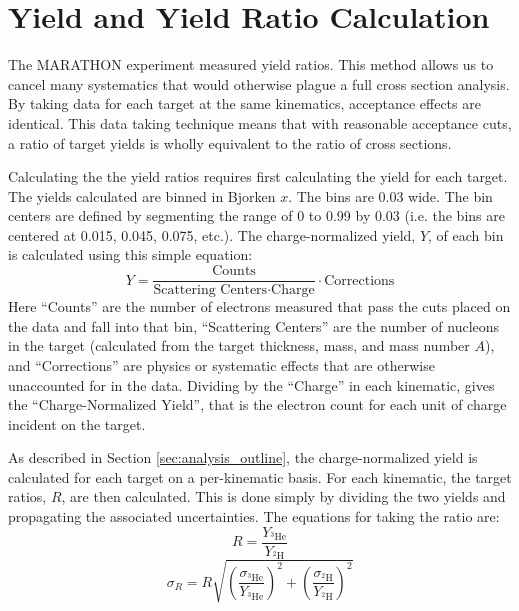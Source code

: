 \section{Yield and Yield Ratio Calculation}

The MARATHON experiment measured yield ratios. This method allows us to cancel many systematics that would otherwise plague a full cross section analysis. By taking data for each target at the same kinematics, acceptance effects are identical. This data taking technique means that with reasonable acceptance cuts, a ratio of target yields is wholly equivalent to the ratio of cross sections.

Calculating the the yield ratios requires first calculating the yield for each target. The yields calculated are binned in Bjorken $x$. The bins are 0.03 wide. The bin centers are defined by segmenting the range of 0 to 0.99 by 0.03 (i.e. the bins are centered at 0.015, 0.045, 0.075, etc.). The charge-normalized yield, $Y$, of each bin is calculated using this simple equation:
\begin{equation}
	Y = \frac{\text{Counts}}{\text{Scattering Centers} \cdot \text{Charge}} \cdot \text{Corrections}
	\label{eqn:yield}
\end{equation}
Here ``Counts'' are the number of electrons measured that pass the cuts placed on the data and fall into that bin, ``Scattering Centers'' are the number of nucleons in the target (calculated from the target thickness, mass, and mass number $A$), and ``Corrections'' are physics or systematic effects that are otherwise unaccounted for in the data. Dividing by the ``Charge'' in each kinematic, gives the ``Charge-Normalized Yield'', that is the electron count for each unit of charge incident on the target.

As described in Section \ref{sec:analysis_outline}, the charge-normalized yield is calculated for each target on a per-kinematic basis. For each kinematic, the target ratios, $R$, are then calculated. This is done simply by dividing the two yields and propagating the associated uncertainties. The equations for taking the ratio are:
\begin{equation}
	R = \frac{Y_{^3\text{He}}}{Y_{^2\text{H}}}
\end{equation}
\begin{equation}
	\sigma_{R} = R\sqrt{\left(\frac{\sigma_{^3\text{He}}}{Y_{^3\text{He}}}\right)^2 + \left(\frac{\sigma_{^2\text{H}}}{Y_{^2\text{H}}}\right)^2}
\end{equation}


